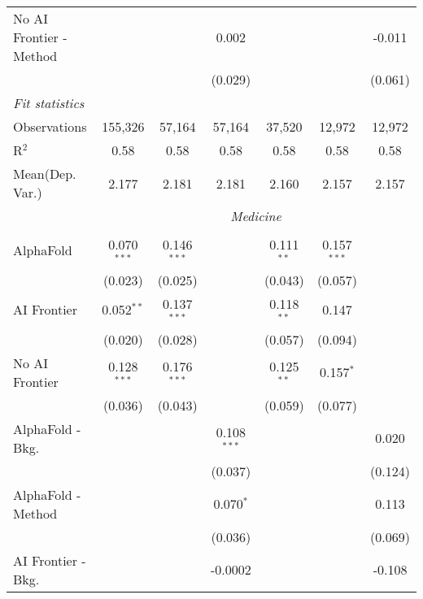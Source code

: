 \begin{tabular}{lcccccc}
   No AI Frontier - Method &               &               & 0.002         &              &              & -0.011\\   
                           &               &               & (0.029)       &              &              & (0.061)\\   
   \midrule
   \emph{Fit statistics}\\
   Observations            & 155,326       & 57,164        & 57,164        & 37,520       & 12,972       & 12,972\\  
   R$^2$                   & 0.58          & 0.58          & 0.58          & 0.58         & 0.58         & 0.58\\  
   
Mean(Dep. Var.) & 2.177 & 2.181 & 2.181 & 2.160 & 2.157 & 2.157 \\
 & \multicolumn{6}{c}{\textit{Medicine}} \\ \\
   AlphaFold               & 0.070$^{***}$ & 0.146$^{***}$ &               & 0.111$^{**}$ & 0.157$^{***}$ &   \\   
                           & (0.023)       & (0.025)       &               & (0.043)      & (0.057)       &   \\   
   AI Frontier             & 0.052$^{**}$  & 0.137$^{***}$ &               & 0.118$^{**}$ & 0.147         &   \\   
                           & (0.020)       & (0.028)       &               & (0.057)      & (0.094)       &   \\   
   No AI Frontier          & 0.128$^{***}$ & 0.176$^{***}$ &               & 0.125$^{**}$ & 0.157$^{*}$   &   \\   
                           & (0.036)       & (0.043)       &               & (0.059)      & (0.077)       &   \\   
   AlphaFold - Bkg.        &               &               & 0.108$^{***}$ &              &               & 0.020\\   
                           &               &               & (0.037)       &              &               & (0.124)\\   
   AlphaFold - Method      &               &               & 0.070$^{*}$   &              &               & 0.113\\   
                           &               &               & (0.036)       &              &               & (0.069)\\   
   AI Frontier - Bkg.      &               &               & -0.0002       &              &               & -0.108\\   

\end{tabular}
